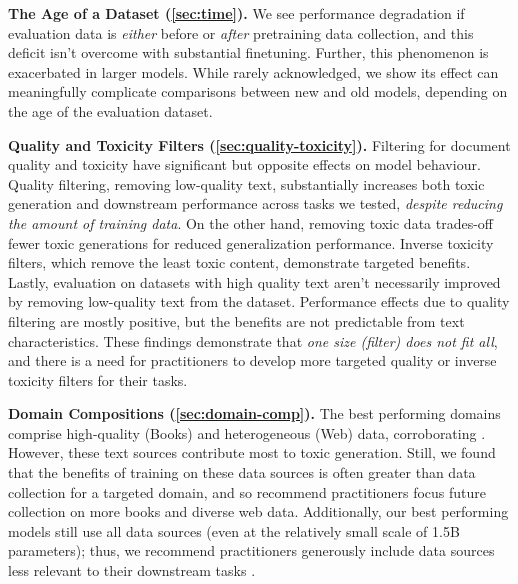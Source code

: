 \documentclass{article}
\begin{document}
\textbf{The Age of a Dataset (\cref{sec:time}).} We see performance degradation if evaluation data is \emph{either} before or \emph{after} pretraining data collection, and this deficit isn't overcome with substantial finetuning.
Further, this phenomenon is exacerbated in larger models. 
While rarely acknowledged, we show its effect can meaningfully complicate comparisons between new and old models, depending on the age of the evaluation dataset.

\textbf{Quality and Toxicity Filters (\cref{sec:quality-toxicity}).}  Filtering for document quality and toxicity have significant but opposite effects on model behaviour. Quality filtering, removing low-quality text, substantially increases both toxic generation and downstream performance across tasks we tested, \emph{despite reducing the amount of training data}.
On the other hand, removing toxic data trades-off fewer toxic generations for reduced generalization performance.
Inverse toxicity filters, which remove the least toxic content, demonstrate targeted benefits. 
Lastly, evaluation on datasets with high quality text aren't necessarily improved by removing low-quality text from the dataset. 
Performance effects due to quality filtering are mostly positive, but the benefits are not predictable from text characteristics. 
These findings demonstrate that \emph{one size (filter) does not fit all}, and there is a need for practitioners to develop more targeted quality or inverse toxicity filters for their tasks.

\textbf{Domain Compositions (\cref{sec:domain-comp}).} The best performing domains comprise high-quality (Books) and heterogeneous (Web) data, corroborating \citet{brown2020language, chowdhery2022palm, xie2023doremi}.
However, these text sources contribute most to toxic generation.
Still, we found that the benefits of training on these data sources is often greater than data collection for a targeted domain, and so recommend practitioners focus future collection on more books and diverse web data.
Additionally, our best performing models still use all data sources (even at the relatively small scale of 1.5B parameters); thus, we recommend practitioners generously include data sources less relevant to their downstream tasks \citep{madaan2022language}.
\end{document}
